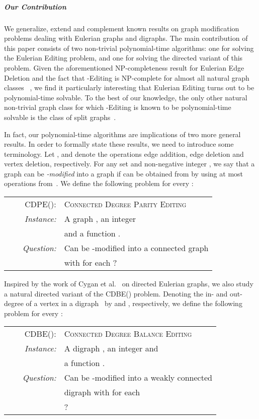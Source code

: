 \documentclass[11pt]{llncs}
\newcommand{\cdpe}{{\sc CDPE}}
\newcommand{\cdbe}{{\sc CDBE}}
\newcommand{\NP}{{\sf NP}}
\begin{document}
\subparagraph{Our Contribution}
We generalize, extend and complement known results on graph modification
problems dealing with Eulerian graphs and digraphs. 
The main contribution of
this paper consists of two non-trivial polynomial-time algorithms: one for
solving the {\sc Eulerian Editing} problem, and one for solving the directed
variant of this problem.
Given the aforementioned \NP-completeness result
for {\sc Eulerian Edge Deletion} and the fact that -{\sc Editing} is
\NP-complete for almost all natural graph classes ~\cite{BurzynBD06,NatanzonSS01}, we find it particularly interesting that
{\sc Eulerian Editing} turns out to be polynomial-time solvable. To the best of
our knowledge, 
the only other natural 
non-trivial graph class  for which -{\sc Editing} is known to be polynomial-time solvable is the class of split
graphs~\cite{HammerS81}.

In fact, our polynomial-time algorithms are implications of two more general
results. In order to formally state these results, we need to introduce some
terminology. Let ,  and  denote the operations edge addition,
edge deletion and vertex deletion, respectively. For any set  and non-negative integer , we say that a graph  can be
{\em -modified} into a graph  if  can be obtained from  by
using at most  operations from~. We define the following problem for
every :
\begin{center}
\begin{boxedminipage}{.99\textwidth}
\begin{tabular}{rl}
\textsc{\cdpe():} & \textsc{Connected Degree Parity Editing}\\
\textit{~~~~Instance:} & A graph , an integer \\
                       & and a function .\\
\textit{Question:} & Can  be -modified into a connected graph \\ 
                   & with  for each ?
                   \end{tabular}
\end{boxedminipage}
\end{center}

Inspired by the work of Cygan et al.~\cite{CyganMPPS14} on directed Eulerian
graphs, we also study a natural directed variant of the \cdbe() problem.
Denoting the in- and out-degree of a vertex  in a digraph~ by 
and , respectively, we define the following problem for every
:
\begin{center}
\begin{boxedminipage}{.99\textwidth}
\begin{tabular}{rl}
\textsc{\cdbe():}   & \textsc{Connected Degree Balance Editing}\\
\textit{~~~~Instance:} & A digraph , an integer  and\\
                       & a function .\\
\textit{Question:}     & Can  be -modified into a weakly connected\\& digraph 
                        with  for each\\
& ?
\end{tabular}
\end{boxedminipage}
\end{center}
\end{document}
